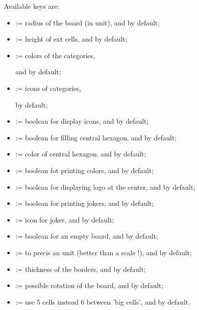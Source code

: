 \documentclass[11pt,a4paper]{ltxdoc}
\begin{document}
Available \textsf{keys} are:

\begin{itemize}
	\item {}:= radius of the board (in unit), and  by default;
	\item {}:= height of ext cells, and  by default;
	\item {}:= colors of the categories,
	
	\hfill{}and  by default;
	\item {}:= icons of categories,
	
	\hfill{} by default;
	\item {}:= boolean for display icons, and  by default;
	\item {}:= boolean for filling central hexagon, and  by default;
	\item {}:= color of central hexagon, and  by default;
	\item {}:= boolean fot printing colors, and  by default;
	\item {}:= boolean for displaying logo at the center, and  by default;
	\item {}:= boolean for printing jokers, and  by default;
	\item {}:= icon for joker, and  by default;
	\item {}:= boolean for an empty board, and  by default;
	\item {}:= to precis an unit (better than a scale !), and  by default;
	\item {}:= thickness of the borders, and \MontreCode{0.8pt} by default;
	\item {}:= possible rotation of the board, and  by default;
	\item {}:= use 5 cells instead 6 between 'big cells', and  by default.
\end{itemize}
\end{document}
